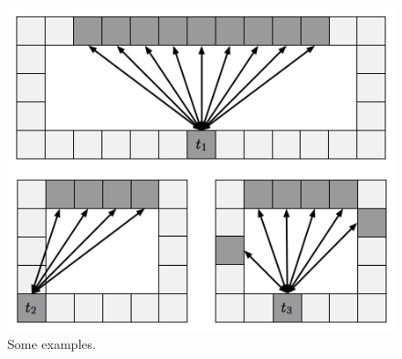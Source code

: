 \begin{figure}[tb]
       \begin{center}
                       \includegraphics[scale=0.5, trim = 10mm 10mm 10mm 0mm]{diagrams/fan.png}
       \end{center}
	\vspace{-3pt}
       \caption{Some examples.}
       \label{fig-fan}
\end{figure}
